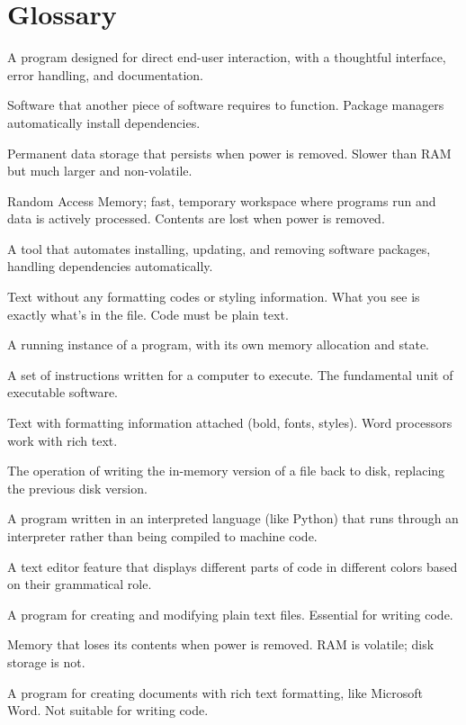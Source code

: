 \documentclass[
  letterpaper,
  DIV=11,
  numbers=noendperiod]{scrreprt}
\providecommand{\tightlist}{%
  \setlength{\itemsep}{0pt}\setlength{\parskip}{0pt}}
\begin{document}
\section{Glossary}\label{glossary}

\begin{description}
\tightlist
\item[\textbf{Application}]
A program designed for direct end-user interaction, with a thoughtful
interface, error handling, and documentation.
\item[\textbf{Dependency}]
Software that another piece of software requires to function. Package
managers automatically install dependencies.
\item[\textbf{Disk (Storage)}]
Permanent data storage that persists when power is removed. Slower than
RAM but much larger and non-volatile.
\item[\textbf{Memory (RAM)}]
Random Access Memory; fast, temporary workspace where programs run and
data is actively processed. Contents are lost when power is removed.
\item[\textbf{Package manager}]
A tool that automates installing, updating, and removing software
packages, handling dependencies automatically.
\item[\textbf{Plain text}]
Text without any formatting codes or styling information. What you see
is exactly what's in the file. Code must be plain text.
\item[\textbf{Process}]
A running instance of a program, with its own memory allocation and
state.
\item[\textbf{Program}]
A set of instructions written for a computer to execute. The fundamental
unit of executable software.
\item[\textbf{Rich text}]
Text with formatting information attached (bold, fonts, styles). Word
processors work with rich text.
\item[\textbf{Save}]
The operation of writing the in-memory version of a file back to disk,
replacing the previous disk version.
\item[\textbf{Script}]
A program written in an interpreted language (like Python) that runs
through an interpreter rather than being compiled to machine code.
\item[\textbf{Syntax highlighting}]
A text editor feature that displays different parts of code in different
colors based on their grammatical role.
\item[\textbf{Text editor}]
A program for creating and modifying plain text files. Essential for
writing code.
\item[\textbf{Volatile}]
Memory that loses its contents when power is removed. RAM is volatile;
disk storage is not.
\item[\textbf{Word processor}]
A program for creating documents with rich text formatting, like
Microsoft Word. Not suitable for writing code.
\end{description}
\end{document}

